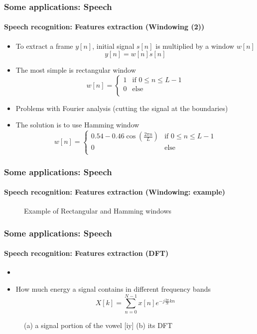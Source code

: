 \documentclass[xcolor=table]{beamer}
\begin{document}
\begin{frame}
	\frametitle{Some applications: Speech}
	\framesubtitle{Speech recognition: Features extraction (Windowing (2))}
	\begin{itemize}
		\item To extract a frame $y[n]$, initial signal $s[n]$ is multiplied by a window $w[n]$ 
		\[y[n] = w[n] s[n]\]
		\item The most simple is rectangular window 
		\[w[n] = \begin{cases}
			1 & \text{if } 0 \le n \le L-1 \\
			0 & \text{else}\\
		\end{cases}\]
		\item Problems with Fourier analysis (cutting the signal at the boundaries)
		\item The solution is to use Hamming window
		\[w[n] = \begin{cases}
			0.54 - 0.46 \cos (\frac{2\pi n}{L}) & \text{if } 0 \le n \le L-1 \\
			0 & \text{else}\\
		\end{cases}\]
	\end{itemize}
\end{frame}

\begin{frame}
	\frametitle{Some applications: Speech}
	\framesubtitle{Speech recognition: Features extraction (Windowing: example)}
	
	\begin{figure}
		\centering
		\caption{Example of Rectangular and Hamming windows \cite{2020-jurafsky-martin}}
	\end{figure}
	
\end{frame}

\begin{frame}
	\frametitle{Some applications: Speech}
	\framesubtitle{Speech recognition: Features extraction (DFT)}
	\begin{itemize}
		\item {}
		\item How much energy a signal contains in different frequency bands
		\[X[k] = \sum\limits_{n=0}^{N-1} x[n] e^{-j\frac{2\pi}{N} k n}\]
	\end{itemize}
	\begin{figure}
		\centering
		\caption{(a) a signal portion of the vowel [iy] (b) its DFT \cite{2020-jurafsky-martin}}
	\end{figure}
\end{frame}
\end{document}
